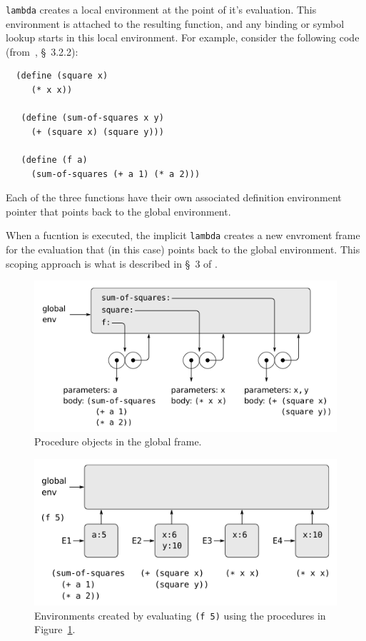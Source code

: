 \documentclass[12pt]{article}
\begin{document}
\verb|lambda| creates a local environment at the point of it's
evaluation. This environment is attached to the resulting function,
and any binding or symbol lookup starts in this local environment. For
example, consider the following code (from~\cite{sicp}, \S~3.2.2):

\begin{verbatim}
  (define (square x)
     (* x x))

   (define (sum-of-squares x y)
     (+ (square x) (square y)))

   (define (f a)
     (sum-of-squares (+ a 1) (* a 2)))
\end{verbatim}

Each of the three functions have their own associated definition
environment pointer that points back to the global environment.

When a fucntion is executed, the implicit \verb|lambda| creates a new
envroment frame for the evaluation that (in this case) points back to
the global environment. This scoping approach is what is described in
\S~3 of \cite{sicp}.

\begin{figure}[htbp] %
   \centering
   \includegraphics[width=5in]{function_declarations.png} 
\caption{Procedure objects in the global frame.}
\label{fig:funcdefs}
\end{figure}

\begin{figure}[htbp] %
   \centering
   \includegraphics[width=5in]{function_invocations.png} 
\caption[Invocation Environments]{Environments created by evaluating
  {\tt (f 5)} using the procedures in Figure~\ref{fig:funcdefs}.}
\label{fig:funcinvocations}
\end{figure}
\end{document}
